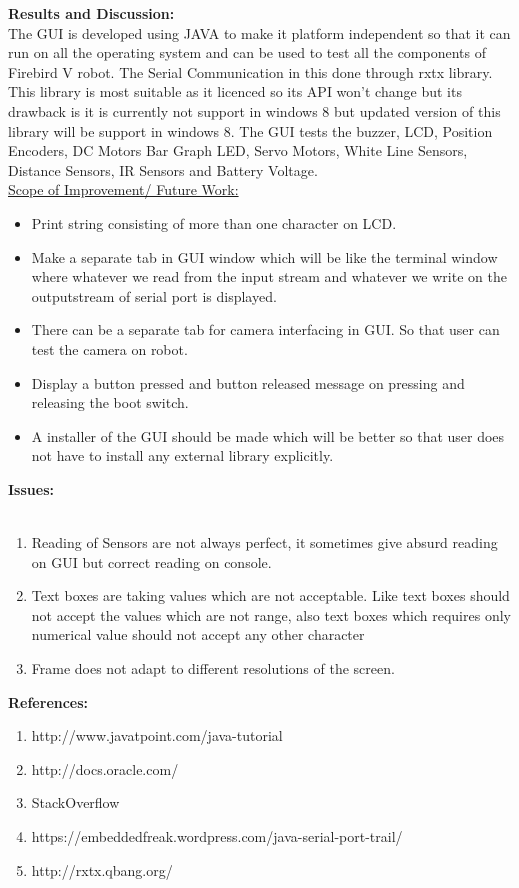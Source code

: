 \documentclass{article}
\begin{document}
	\newpage
	\textbf{\huge Results and Discussion:} \vspace{1cm} \\
	 The GUI is developed using JAVA to make it platform independent so that it can run on all the operating system and can be used to test all the components of Firebird V robot. The Serial Communication in this done through rxtx library. This library is most suitable as it licenced so its API won't change but its drawback is it is currently not support in windows 8 but updated version of this library will be support in windows 8. The GUI tests the buzzer, LCD, Position Encoders, DC Motors Bar Graph LED, Servo Motors, White Line Sensors, Distance Sensors, IR Sensors and Battery Voltage. \vspace{1cm} \\  
	 \underline{Scope of Improvement/ Future Work:}
	 \begin{itemize}
	 	\item Print string consisting of more than one character on LCD. 
	 	\item Make a separate tab in GUI window which will be like the terminal window where whatever we read from the input stream and whatever we write on the outputstream of serial port is displayed.
	 	\item There can be a separate tab for camera interfacing in GUI. So that user can test the camera on robot.
	 	\item Display a button pressed and button released message on pressing and releasing the boot switch.
	 	\item A installer of the GUI should be made which will be better so that user does not have to install any external library explicitly.  
	 \end{itemize} 
	\newpage
	\textbf{\huge Issues:} \\ \\
	\begin{enumerate}
		\item Reading of Sensors are not always perfect, it sometimes give absurd reading on GUI but correct reading on console.
		\item Text boxes are taking values which are not acceptable. Like text boxes should not accept the values which are not range, also text boxes which requires only numerical value should not accept any other character
		\item Frame does not adapt to different resolutions of the screen. 
	\end{enumerate}
	\newpage
	\textbf{\huge References:} \\ \vspace{1cm}
	\begin{enumerate}
		\item http://www.javatpoint.com/java-tutorial
		\item http://docs.oracle.com/
		\item StackOverflow
		\item https://embeddedfreak.wordpress.com/java-serial-port-trail/
		\item http://rxtx.qbang.org/
	\end{enumerate}
\end{document}
